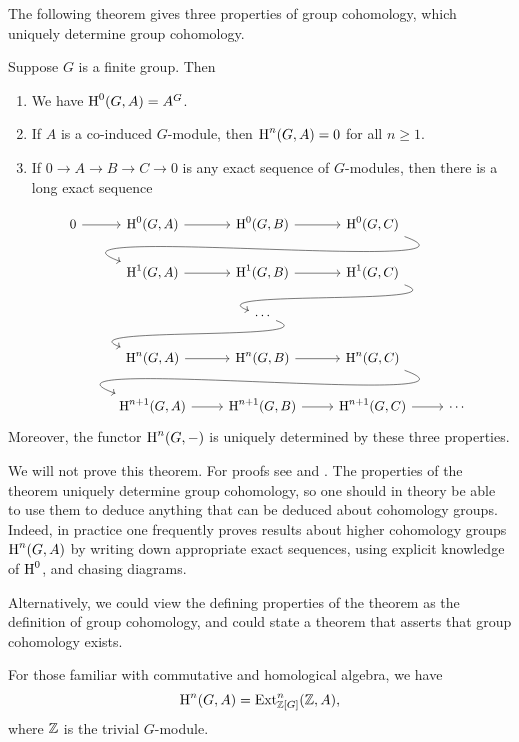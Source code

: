 The following theorem gives three properties of group cohomology,
which uniquely determine group cohomology.
\begin{theorem}\label{thm:cohomology}
	Suppose $G$ is a finite group.  Then
	\begin{enumerate}
		\item
			We have $\operatorname{H}^0(G,A) = A^G$.
		\item
			If $A$ is a co-induced $G$-module,
			then $\operatorname{H}^n(G,A) = 0$ for all $n\geq 1$.
		\item
			If $0\to A \to B \to C \to 0$ is any exact sequence of
			$G$-modules, then there is a long exact sequence
	\end{enumerate}
	$$
	\begin{tikzcd}
0 \rar & \H^0(G,A) \rar & \H^0(G,B) \rar & \H^0(G,C) \ar[out=-20, in=160]{dll}
\\
& \H^1(G,A) \rar & \H^1(G,B) \rar & \H^1(G,C) \ar[out=-20, in=160]{dl}
\\
& & \cdots \ar[out=-20, in=160]{dl}
\\
& \H^n(G,A) \rar & \H^n(G,B) \rar & \H^n(G,C) \ar[out=-20, in=160]{dll}
\\
& \H^{n+1}(G,A) \rar & \H^{n+1}(G,B) \rar & \H^{n+1}(G,C) \rar & \cdots
	\end{tikzcd}
	$$
	Moreover, the functor $\operatorname{H}^n(G,-)$ is uniquely determined by
	these three properties.
\end{theorem}

We will not prove this theorem.  For proofs see
\cite[Atiyah-Wall]{cassels-frohlich} and
\cite[Ch.~7]{serre:localfields}. The properties of the theorem
uniquely determine group cohomology, so one should in theory be able
to use them to deduce anything that can be deduced about cohomology
groups.  Indeed, in practice one frequently proves results about
higher cohomology groups $\operatorname{H}^n(G,A)$ by writing down appropriate exact
sequences, using explicit knowledge of $\operatorname{H}^0$, and chasing diagrams.

\begin{remark}
	Alternatively, we could view the defining properties of the theorem
	as the definition of group cohomology, and could state a theorem
	that asserts that group cohomology exists.
\end{remark}

\begin{remark}
	For those familiar with commutative and homological algebra, we have
	$$
		\operatorname{H}^n(G,A) = \operatorname{Ext}^n_{\mathbb{Z}[G]}(\mathbb{Z}, A),
	$$
	where $\mathbb{Z}$ is the trivial $G$-module.
\end{remark}

